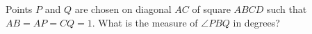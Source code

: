 Points $P$ and $Q$ are chosen on diagonal $AC$ of square $ABCD$ such that $AB=AP=CQ=1$. What is the measure of $\angle{PBQ}$ in degrees?